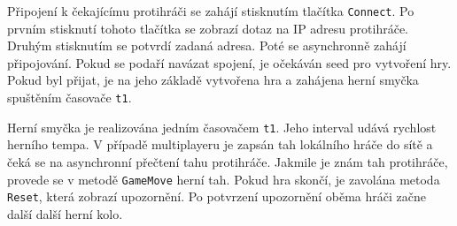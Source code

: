 \documentclass[12pt]{article}
\begin{document}
 Připojení k čekajícímu protihráči se zahájí stisknutím tlačítka \texttt{Connect}. Po prvním stisknutí tohoto tlačítka se zobrazí dotaz na IP adresu protihráče. Druhým stisknutím se potvrdí zadaná adresa. Poté se asynchronně zahájí připojování. Pokud se podaří navázat spojení, je očekáván seed pro vytvoření hry. Pokud byl přijat, je na jeho základě vytvořena hra a zahájena herní smyčka spuštěním časovače \texttt{t1}.
 
 Herní smyčka je realizována jedním časovačem \texttt{t1}. Jeho interval udává rychlost herního tempa. V případě multiplayeru je zapsán tah lokálního hráče do sítě a čeká se na asynchronní přečtení tahu protihráče. Jakmile je znám tah protihráče, provede se v metodě \texttt{GameMove} herní tah. Pokud hra skončí, je zavolána metoda \texttt{Reset}, která zobrazí upozornění. Po potvrzení upozornění oběma hráči začne další další herní kolo.

 
\end{document}
